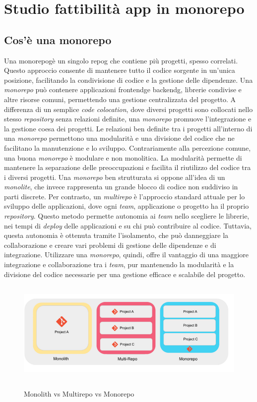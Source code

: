 \chapter{Studio fattibilità app in monorepo}
\label{chap:studio_fattibilita}
\section{Cos'è una monorepo}
Una \gls{monorepog}\glox è un singolo \gls{repog} che contiene più progetti, spesso correlati.
Questo approccio consente di mantenere tutto il codice sorgente in un'unica posizione, facilitando la condivisione di codice e la gestione delle dipendenze.
Una \textit{monorepo} può contenere applicazioni \gls{frontendg}\glox e \gls{backendg}\glox, librerie condivise e altre risorse comuni, permettendo una gestione centralizzata del progetto.
A differenza di un semplice \textit{code colocation}, dove diversi progetti sono collocati nello stesso \textit{repository} senza relazioni definite, una \textit{monorepo} promuove l'integrazione e la gestione coesa dei progetti.
Le relazioni ben definite tra i progetti all'interno di una \textit{monorepo} permettono una modularità e una divisione del codice che ne facilitano la manutenzione e lo sviluppo.
Contrariamente alla percezione comune, una buona \textit{monorepo} è modulare e non monolitica.
La modularità permette di mantenere la separazione delle preoccupazioni e facilita il riutilizzo del codice tra i diversi progetti.
Una \textit{monorepo} ben strutturata si oppone all'idea di un \textit{monolite}, che invece rappresenta un grande blocco di codice non suddiviso in parti discrete.
Per contrasto, un \textit{multirepo} è l'approccio standard attuale per lo sviluppo delle applicazioni, dove ogni \textit{team}, applicazione o progetto ha il proprio \textit{repository}.
Questo metodo permette autonomia ai \textit{team} nello scegliere le librerie, nei tempi di \textit{deploy} delle applicazioni e su chi può contribuire al codice.
Tuttavia, questa autonomia è ottenuta tramite l'isolamento, che può danneggiare la collaborazione e creare vari problemi di gestione delle dipendenze e di integrazione.
Utilizzare una \textit{monorepo}, quindi, offre il vantaggio di una maggiore integrazione e collaborazione tra i \textit{team}, pur mantenendo la modularità e la divisione del codice necessarie per una gestione efficace e scalabile del progetto.

\begin{figure}[H]
\centering
\includegraphics[alt={Differenze tra monolith multi-repo e monorepo}, height=5cm]{img/monorepocompare.png}
\caption{Monolith vs Multirepo vs Monorepo}
\label{fig
}
\end{figure}

